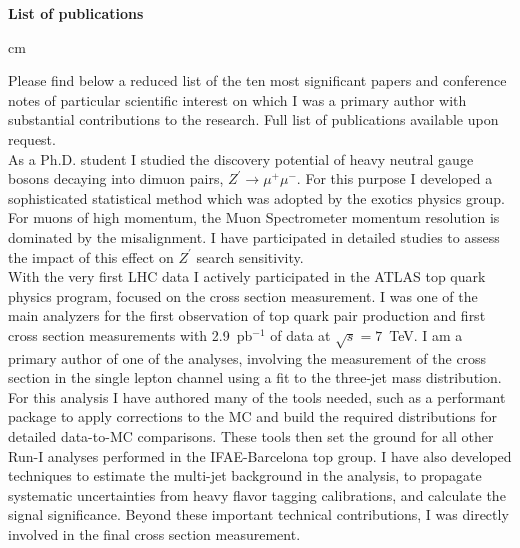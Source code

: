 \documentclass[12pt]{article}
\begin{document}
\pagestyle{fancy}
\fancyhf{}







\begin{center}
{\bf \Large List of publications} \\
\end{center}

 cm

\noindent Please find below a reduced list of the ten most significant papers and conference notes of particular scientific interest on which I was a primary author with substantial
contributions to the research. Full list of publications available upon request.\\


\noindent [1]  As a Ph.D. student I studied the discovery potential of heavy neutral gauge bosons decaying into dimuon pairs, $Z^{\prime} \rightarrow \mu^{+}\mu^{-}$. 
For this purpose I developed a sophisticated statistical method which was adopted by the exotics physics group. For muons of high momentum, 
the Muon Spectrometer momentum resolution is dominated by the misalignment. I have participated in detailed studies to assess the impact of this effect on $Z^{\prime}$ 
search sensitivity.\\

\noindent [2] With the very first LHC data I actively participated in the ATLAS top quark physics program, focused on the cross section measurement. 
I was one of the main analyzers for the first observation of top quark pair production and first cross section measurements with 2.9~pb$^{-1}$ of data at $\sqrt{s}=7$~TeV. 
I am a primary author of one of the analyses, involving the measurement of the cross section in the single lepton channel using a fit to the three-jet mass distribution. 
For this analysis I have authored many of the tools needed, such as a performant package to apply corrections to the MC and build the required distributions for detailed data-to-MC
comparisons. These tools then set the ground for all other Run-I analyses performed in the IFAE-Barcelona top group.
I have also developed techniques to estimate the multi-jet background in the analysis, to propagate systematic uncertainties from heavy flavor tagging calibrations, 
and calculate the signal significance. Beyond these important technical contributions, I was directly involved in the final cross section measurement.\\
\end{document}
